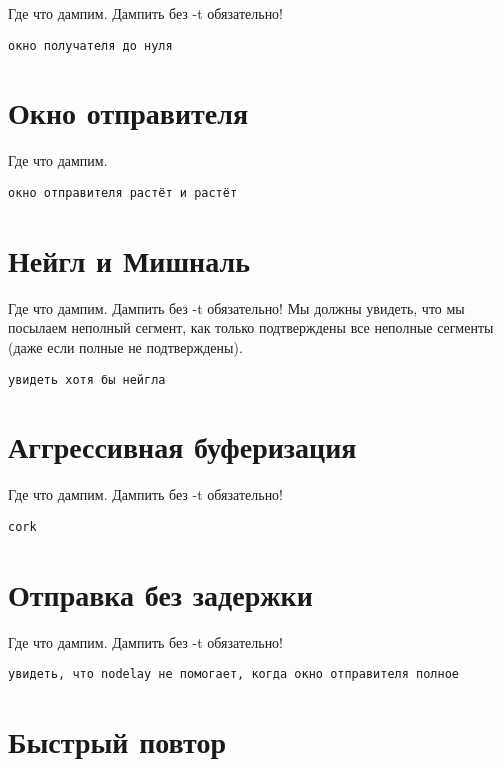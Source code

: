 \documentclass[a4paper,12pt]{article}
\begin{document}
Где что дампим.  Дампить без -t обязательно!

\begin{Verbatim}
окно получателя до нуля
\end{Verbatim}

\section{Окно отправителя}

Где что дампим.

\begin{Verbatim}
окно отправителя растёт и растёт
\end{Verbatim}

\section{Нейгл и Мишналь}

Где что дампим.  Дампить без -t обязательно!
Мы должны увидеть, что мы посылаем неполный сегмент, как только подтверждены все неполные сегменты (даже если полные не подтверждены).

\begin{Verbatim}
увидеть хотя бы нейгла
\end{Verbatim}

\section{Аггрессивная буферизация}

Где что дампим.  Дампить без -t обязательно!

\begin{Verbatim}
cork
\end{Verbatim}

\section{Отправка без задержки}

Где что дампим.  Дампить без -t обязательно!

\begin{Verbatim}
увидеть, что nodelay не помогает, когда окно отправителя полное
\end{Verbatim}

\section{Быстрый повтор}
\end{document}
